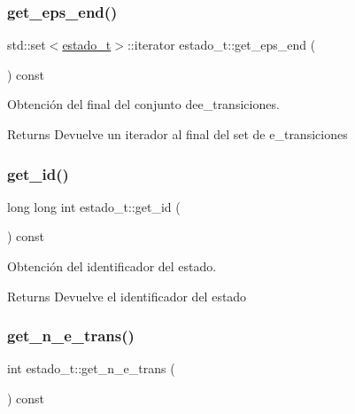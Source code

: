 \subsubsection{\texorpdfstring{get\+\_\+eps\+\_\+end()}{get\_eps\_end()}}
{\footnotesize\ttfamily std\+::set$<$\hyperlink{classestado__t}{estado\+\_\+t}$>$\+::iterator estado\+\_\+t\+::get\+\_\+eps\+\_\+end (\begin{DoxyParamCaption}{ }\end{DoxyParamCaption}) const\hspace{0.3cm}{\ttfamily [inline]}}



Obtención del final del conjunto dee\+\_\+transiciones. 

\begin{DoxyReturn}{Returns}
Devuelve un iterador al final del set de e\+\_\+transiciones 
\end{DoxyReturn}
\mbox{\label{classestado__t_a399434150ccd2b0f6b3515a39e8f66bc}} 
\subsubsection{\texorpdfstring{get\+\_\+id()}{get\_id()}}
{\footnotesize\ttfamily long long int estado\+\_\+t\+::get\+\_\+id (\begin{DoxyParamCaption}{ }\end{DoxyParamCaption}) const\hspace{0.3cm}{\ttfamily [inline]}}



Obtención del identificador del estado. 

\begin{DoxyReturn}{Returns}
Devuelve el identificador del estado 
\end{DoxyReturn}
\mbox{\label{classestado__t_a9dd2c448db4e82bf749261309a84ae92}} 
\subsubsection{\texorpdfstring{get\+\_\+n\+\_\+e\+\_\+trans()}{get\_n\_e\_trans()}}
{\footnotesize\ttfamily int estado\+\_\+t\+::get\+\_\+n\+\_\+e\+\_\+trans (\begin{DoxyParamCaption}{ }\end{DoxyParamCaption}) const\hspace{0.3cm}{\ttfamily [inline]}}



